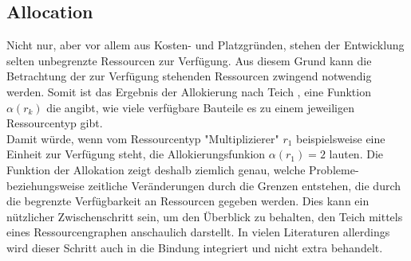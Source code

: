 \documentclass[conference]{IEEEtran}
\begin{document}
\subsection{Allocation}






Nicht nur, aber vor allem aus Kosten- und Platzgründen, stehen der Entwicklung selten unbegrenzte Ressourcen zur Verfügung. Aus diesem Grund kann die Betrachtung der zur Verfügung stehenden Ressourcen zwingend notwendig werden. Somit ist das Ergebnis der Allokierung nach Teich \cite{1}    
, eine Funktion $ \alpha(r_k)$ die angibt, wie viele verfügbare Bauteile es zu einem jeweiligen Ressourcentyp gibt.\\
Damit würde, wenn vom Ressourcentyp "Multiplizierer" $r_1$ beispielsweise eine Einheit zur Verfügung steht, die Allokierungsfunkion $\alpha(r_1) = 2$ lauten. Die Funktion der Allokation zeigt deshalb ziemlich genau, welche Probleme- beziehungsweise zeitliche Veränderungen durch die Grenzen entstehen, die durch die begrenzte Verfügbarkeit an Ressourcen gegeben werden. Dies kann ein nützlicher Zwischenschritt sein, um den Überblick zu behalten, den Teich mittels eines Ressourcengraphen anschaulich darstellt. In vielen Literaturen allerdings wird dieser Schritt auch in die Bindung integriert und nicht extra behandelt.
\end{document}
